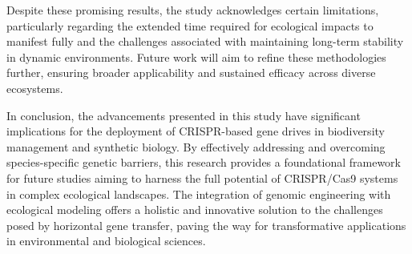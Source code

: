 \documentclass{article}
\begin{document}
Despite these promising results, the study acknowledges certain limitations, particularly regarding the extended time required for ecological impacts to manifest fully and the challenges associated with maintaining long-term stability in dynamic environments. Future work will aim to refine these methodologies further, ensuring broader applicability and sustained efficacy across diverse ecosystems. 

In conclusion, the advancements presented in this study have significant implications for the deployment of CRISPR-based gene drives in biodiversity management and synthetic biology. By effectively addressing and overcoming species-specific genetic barriers, this research provides a foundational framework for future studies aiming to harness the full potential of CRISPR/Cas9 systems in complex ecological landscapes. The integration of genomic engineering with ecological modeling offers a holistic and innovative solution to the challenges posed by horizontal gene transfer, paving the way for transformative applications in environmental and biological sciences.
\end{document}
